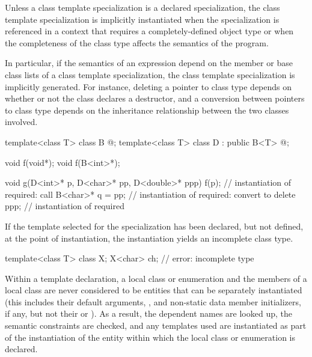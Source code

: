 \pnum
{}%
Unless a class template specialization is a declared specialization,
the class template specialization is implicitly instantiated when the
specialization is referenced in a context that requires a completely-defined
object type or when the completeness of the class type affects the semantics
of the program.
\begin{note}
In particular, if the semantics of an expression depend on the member or
base class lists of a class template specialization, the class template
specialization is implicitly generated. For instance, deleting a pointer
to class type depends on whether or not the class declares a destructor,
and a conversion between pointers to class type depends on the
inheritance relationship between the two classes involved.
\end{note}
\begin{example}
\begin{codeblock}
template<class T> class B { @\commentellip@ };
template<class T> class D : public B<T> { @\commentellip@ };

void f(void*);
void f(B<int>*);

void g(D<int>* p, D<char>* pp, D<double>* ppp) {
  f(p);             // instantiation of  required: call 
  B<char>* q = pp;  // instantiation of  required: convert  to 
  delete ppp;       // instantiation of  required
}
\end{codeblock}
\end{example}
If the template selected for the specialization
has been declared, but not defined,
at the point of instantiation,
the instantiation yields an incomplete class type.
\begin{example}
\begin{codeblock}
template<class T> class X;
X<char> ch;         // error: incomplete type 
\end{codeblock}
\end{example}
\begin{note}
Within a template declaration,
a local class or enumeration and the members of
a local class are never considered to be entities that can be separately
instantiated (this includes their default arguments,
, and non-static data member
initializers, if any,
but not their  or ).
As a result, the dependent names are looked up, the
semantic constraints are checked, and any templates used are instantiated as
part of the instantiation of the entity within which the local class or
enumeration is declared.
\end{note}

